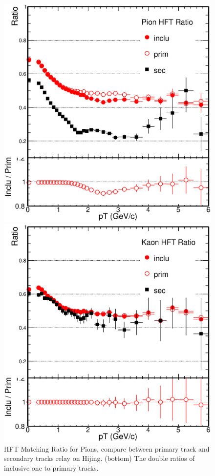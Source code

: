 \begin{figure}[htbp]
\begin{minipage}[htbp]{0.47\linewidth}
\centering
\includegraphics[width=1.0\textwidth,angle=0]{figure/Run14_D0HFT/Double_Ratio_Pion.eps}
\caption{ HFT Matching Ratio for Pions, compare between primary track and secondary tracks relay on Hijing. (bottom) The double ratios of inclusive one to primary tracks.\label{HijingPionsRatio}}
\end{minipage}
\hfill
\begin{minipage}[htbp]{0.47\linewidth}
\centering
\includegraphics[width=1.0\textwidth,angle=0]{figure/Run14_D0HFT/Double_Ratio_Kaon.eps} 

\end{minipage}
\end{figure}

